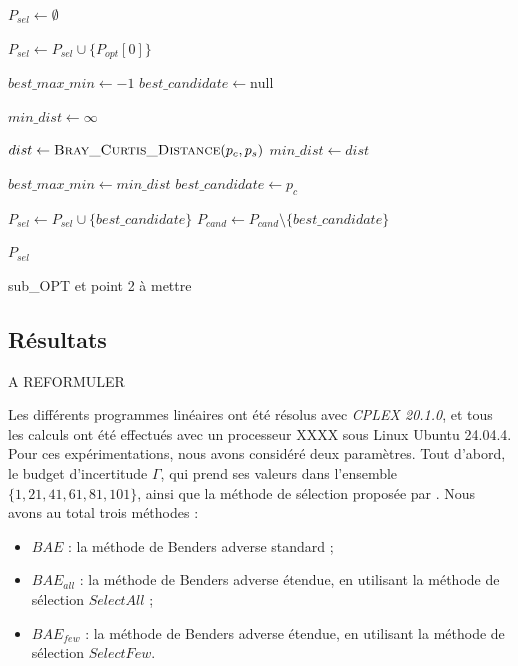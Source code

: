 \documentclass[12pt, a4paper, twoside]{report}
\numberwithin{equation}{section}
\begin{document}
\begin{Figure}[H]
\begin{algorithm}[H]
\begin{algorithmic}[1]
			\State $P_{sel} \gets \emptyset$
			
			 
			\State $P_{sel} \gets P_{sel} \cup \{P_{opt}[0]\}$
			\EndIf
			
			\State $best\_max\_min \gets -1$
			\State $best\_candidate \gets \text{null}$
			
			  
			\State $min\_dist \gets \infty$
			
			   
			\State $dist \gets \Call{Bray\_Curtis\_Distance}{p_c, p_s}$ 
			\State $min\_dist \gets dist$
			\EndIf
			\EndFor
			
			 
			\State $best\_max\_min \gets min\_dist$
			\State $best\_candidate \gets p_c$
			\EndIf
			\EndFor
			
			\State $P_{sel} \gets P_{sel} \cup \{best\_candidate\}$
			\State $P_{cand} \gets P_{cand} \setminus \{best\_candidate\}$
			\EndWhile
			
			\State \Return $P_{sel}$
		\end{algorithmic}
	\end{algorithm}
	
	\newpage
	sub\_OPT et point 2 à mettre
	
	\subsection{Résultats} A REFORMULER
	
	Les différents programmes linéaires ont été résolus avec \textit{CPLEX 20.1.0}, et tous les calculs ont été effectués avec un processeur XXXX sous Linux Ubuntu 24.04.4. Pour ces expérimentations, nous avons considéré deux paramètres. Tout d'abord, le budget d'incertitude $\Gamma$, qui prend ses valeurs dans l'ensemble $\{1, 21, 41, 61, 81,101\}$, ainsi que la méthode de sélection proposée par \cite{portoleauTHESIS}. Nous avons au total trois méthodes :
	
	\begin{itemize}
		\item[] $BAE$ : la méthode de Benders adverse standard ;
		\item[] $BAE_{all}$ : la méthode de Benders adverse étendue, en utilisant la méthode de sélection $SelectAll$ ;
		\item[] $BAE_{few}$ : la méthode de Benders adverse étendue, en utilisant la méthode de sélection $SelectFew$.
	\end{itemize}
	

\end{Figure}
\end{document}
